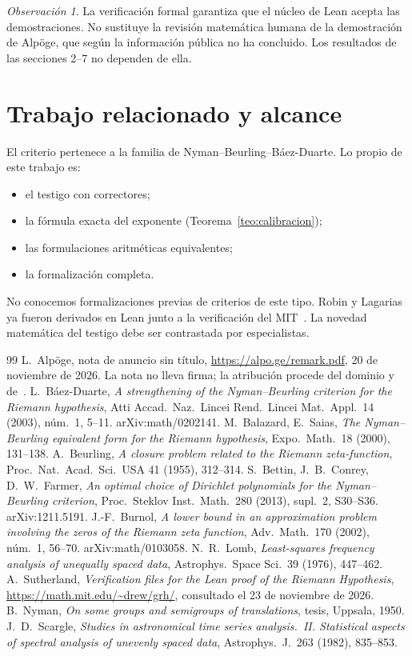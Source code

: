 \documentclass[11pt,a4paper]{amsart}
\theoremstyle{definition}
\theoremstyle{remark}
\newtheorem{observacion}[teorema]{Observaci\'on}
\begin{document}
\begin{observacion}
La verificaci\'on formal garantiza que el n\'ucleo de Lean acepta las demostraciones. No sustituye la revisi\'on matem\'atica humana de la demostraci\'on de Alp\"oge, que seg\'un la informaci\'on p\'ublica no ha concluido. Los resultados de las secciones 2--7 no dependen de ella.
\end{observacion}

\section{Trabajo relacionado y alcance}

El criterio pertenece a la familia de Nyman--Beurling--B\'aez-Duarte. Lo propio de este trabajo es:
\begin{itemize}
\item el testigo con correctores;
\item la f\'ormula exacta del exponente (Teorema~\ref{teo:calibracion});
\item las formulaciones aritm\'eticas equivalentes;
\item la formalizaci\'on completa.
\end{itemize}
No conocemos formalizaciones previas de criterios de este tipo. Robin y Lagarias ya fueron derivados en Lean junto a la verificaci\'on del MIT~\cite{MIT}. La novedad matem\'atica del testigo debe ser contrastada por especialistas.

\begin{thebibliography}{99}
 L.~Alp\"oge, nota de anuncio sin t\'itulo, \url{https://alpo.ge/remark.pdf}, 20 de noviembre de 2026. La nota no lleva firma; la atribuci\'on procede del dominio y de~\cite{MIT}.
 L.~B\'aez-Duarte, \emph{A strengthening of the Nyman--Beurling criterion for the Riemann hypothesis}, Atti Accad.\ Naz.\ Lincei Rend.\ Lincei Mat.\ Appl.\ 14 (2003), n\'um.~1, 5--11. arXiv:math/0202141.
 M.~Balazard, E.~Saias, \emph{The Nyman--Beurling equivalent form for the Riemann hypothesis}, Expo.\ Math.\ 18 (2000), 131--138.
 A.~Beurling, \emph{A closure problem related to the Riemann zeta-function}, Proc.\ Nat.\ Acad.\ Sci.\ USA 41 (1955), 312--314.
 S.~Bettin, J.~B.~Conrey, D.~W.~Farmer, \emph{An optimal choice of Dirichlet polynomials for the Nyman--Beurling criterion}, Proc.\ Steklov Inst.\ Math.\ 280 (2013), supl.~2, S30--S36. arXiv:1211.5191.
 J.-F.~Burnol, \emph{A lower bound in an approximation problem involving the zeros of the Riemann zeta function}, Adv.\ Math.\ 170 (2002), n\'um.~1, 56--70. arXiv:math/0103058.
 N.~R.~Lomb, \emph{Least-squares frequency analysis of unequally spaced data}, Astrophys.\ Space Sci.\ 39 (1976), 447--462.
 A.~Sutherland, \emph{Verification files for the Lean proof of the Riemann Hypothesis}, \url{https://math.mit.edu/~drew/grh/}, consultado el 23 de noviembre de 2026.
 B.~Nyman, \emph{On some groups and semigroups of translations}, tesis, Uppsala, 1950.
 J.~D.~Scargle, \emph{Studies in astronomical time series analysis.~II. Statistical aspects of spectral analysis of unevenly spaced data}, Astrophys.\ J.\ 263 (1982), 835--853.
\end{thebibliography}
\end{document}
